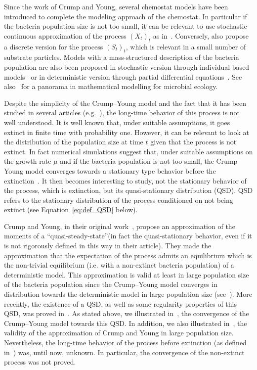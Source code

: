 \documentclass[10pt]{amsart}
\theoremstyle{definition}\newtheorem{defi}[theo]{Definition}\newtheorem{rema}[theo]{Remark}\newtheorem{exam}[theo]{Example}\newtheorem{exem}[theo]{Example}\newtheorem{nota}[theo]{Notation}
\newcommand{\1}{\mathbf{1}}
\begin{document}
Since the work of Crump and Young, several chemostat models have been introduced to complete the modeling approach of the chemostat. In particular if the bacteria population size is not too small, it can be relevant to use stochastic continuous approximation of the process $(X_t)_t$ as in~\cite{CF17,CJL11, FRRS}. Conversely, \cite{CJL11} also propose a discrete version for the process $(S_t)_t$, which is relevant in a small number of substrate particles. Models with a mass-structured description of the bacteria population are also been proposed in stochastic version through individual based models~\cite{CF15,FHC} or in deterministic version through partial differential equations~\cite{fredrickson1967a, ramkrishna1979a}. See also~\cite{W16} for a panorama in mathematical modelling for microbial ecology.

Despite the simplicity of the Crump--Young model and the fact that it has been studied in several articles (e.g.~\cite{CF17, CJL11,CMMS,CY79,W16}), the long-time behavior of this process is not well understood. It is well known that, under suitable assumptions, it goes extinct in finite time with probability one. However, it can be relevant to look at the distribution of the population size at time $t$ given that the process is not extinct. In fact numerical simulations suggest that, under suitable assumptions on the growth rate $\mu$ and if the bacteria population is not too small, the Crump--Young model converges towards a stationary type behavior before the extinction~\cite{CF17}. It then becomes interesting to study, not the stationary behavior of the process, which is extinction, but its quasi-stationary distribution (QSD). QSD refers to the stationary distribution of the process conditioned on not being extinct (see Equation~\eqref{eq:def_QSD} below).

Crump and Young, in their original work~\cite{CY79}, propose an approximation of the moments of a ``quasi-steady-state''(in fact the quasi-stationary behavior, even if it is not rigorously defined in this way in their article). They made the approximation that the expectation of the process admits an equilibrium which is the non-trivial equilibrium (i.e. with a non-extinct bacteria population) of a deterministic model. This approximation is valid at least in large population size of the bacteria population since the Crump--Young model converges in distribution towards the deterministic model in large population size (see~\cite{CF17}). More recently, the existence of a QSD, as well as some regularity properties of this QSD, was proved in~\cite{CMMS}. As stated above, we illustrated in~\cite{CF17}, the convergence of the Crump--Young model towards this QSD. In addition, we also illustrated in~\cite{CF17}, the validity of the approximation of Crump and Young in large population size. Nevertheless, the long-time behavior of the process before extinction (as defined in~\cite{CMS13,MV12,VP13}) was, until now, unknown. In particular, the convergence of the non-extinct process was not proved.
\end{document}
